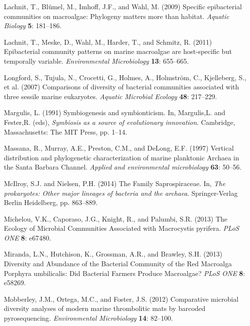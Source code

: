 \documentclass[12pt,]{article}
\begin{document}
\leavevmode\hypertarget{ref-Lachnit2009}{}%
Lachnit, T., Blümel, M., Imhoff, J.F., and Wahl, M. (2009) Specific
epibacterial communities on macroalgae: Phylogeny matters more than
habitat. \emph{Aquatic Biology} \textbf{5}: 181--186.

\leavevmode\hypertarget{ref-Lachnit2011}{}%
Lachnit, T., Meske, D., Wahl, M., Harder, T., and Schmitz, R. (2011)
Epibacterial community patterns on marine macroalgae are host-specific
but temporally variable. \emph{Environmental Microbiology} \textbf{13}:
655--665.

\leavevmode\hypertarget{ref-Longford2007}{}%
Longford, S., Tujula, N., Crocetti, G., Holmes, A., Holmström, C.,
Kjelleberg, S., et al. (2007) Comparisons of diversity of bacterial
communities associated with three sessile marine eukaryotes.
\emph{Aquatic Microbial Ecology} \textbf{48}: 217--229.

\leavevmode\hypertarget{ref-Margulis1991}{}%
Margulis, L. (1991) Symbiogenesis and symbionticism. In, Margulis,L. and
Fester,R. (eds), \emph{Symbiosis as a source of evolutionary
innovation}. Cambridge, Massachusetts: The MIT Press, pp. 1--14.

\leavevmode\hypertarget{ref-Massana1997}{}%
Massana, R., Murray, A.E., Preston, C.M., and DeLong, E.F. (1997)
Vertical distribution and phylogenetic characterization of marine
planktonic Archaea in the Santa Barbara Channel. \emph{Applied and
environmental microbiology} \textbf{63}: 50--56.

\leavevmode\hypertarget{ref-McIlroy2014}{}%
McIlroy, S.J. and Nielsen, P.H. (2014) The Family Saprospiraceae. In,
\emph{The prokaryotes: Other major lineages of bacteria and the
archaea}. Springer-Verlag Berlin Heidelberg, pp. 863--889.

\leavevmode\hypertarget{ref-Michelou2013}{}%
Michelou, V.K., Caporaso, J.G., Knight, R., and Palumbi, S.R. (2013) The
Ecology of Microbial Communities Associated with Macrocystis pyrifera.
\emph{PLoS ONE} \textbf{8}: e67480.

\leavevmode\hypertarget{ref-Miranda2013}{}%
Miranda, L.N., Hutchison, K., Grossman, A.R., and Brawley, S.H. (2013)
Diversity and Abundance of the Bacterial Community of the Red Macroalga
Porphyra umbilicalis: Did Bacterial Farmers Produce Macroalgae?
\emph{PLoS ONE} \textbf{8}: e58269.

\leavevmode\hypertarget{ref-Mobberley2012}{}%
Mobberley, J.M., Ortega, M.C., and Foster, J.S. (2012) Comparative
microbial diversity analyses of modern marine thrombolitic mats by
barcoded pyrosequencing. \emph{Environmental Microbiology} \textbf{14}:
82--100.
\end{document}
